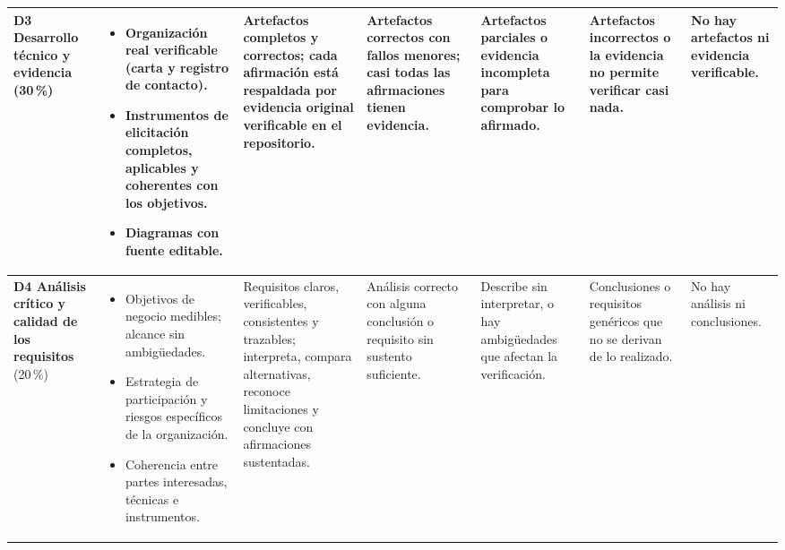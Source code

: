 \documentclass[11pt]{article}
\begin{document}
\begin{landscape}
{\begin{longtable}{|L{2.4cm}|L{5.6cm}|L{3.1cm}|L{2.8cm}|L{2.8cm}|L{2.7cm}|L{2.1cm}|}
	\hline
	\textbf{D3 Desarrollo técnico y evidencia} (30\,\%) & \begin{itemize}[leftmargin=9pt,itemsep=0pt,topsep=0pt,parsep=0pt,partopsep=0pt,after=\vspace{-\baselineskip}]\item Organización real verificable (carta y registro de contacto).\item Instrumentos de elicitación completos, aplicables y coherentes con los objetivos.\item Diagramas con fuente editable.\end{itemize} & Artefactos completos y correctos; cada afirmación está respaldada por evidencia original verificable en el repositorio. & Artefactos correctos con fallos menores; casi todas las afirmaciones tienen evidencia. & Artefactos parciales o evidencia incompleta para comprobar lo afirmado. & Artefactos incorrectos o la evidencia no permite verificar casi nada. & No hay artefactos ni evidencia verificable.\\
	\hline
	\textbf{D4 Análisis crítico y calidad de los requisitos} (20\,\%) & \begin{itemize}[leftmargin=9pt,itemsep=0pt,topsep=0pt,parsep=0pt,partopsep=0pt,after=\vspace{-\baselineskip}]\item Objetivos de negocio medibles; alcance sin ambigüedades.\item Estrategia de participación y riesgos específicos de la organización.\item Coherencia entre partes interesadas, técnicas e instrumentos.\end{itemize} & Requisitos claros, verificables, consistentes y trazables; interpreta, compara alternativas, reconoce limitaciones y concluye con afirmaciones sustentadas. & Análisis correcto con alguna conclusión o requisito sin sustento suficiente. & Describe sin interpretar, o hay ambigüedades que afectan la verificación. & Conclusiones o requisitos genéricos que no se derivan de lo realizado. & No hay análisis ni conclusiones.\\
	\hline

\end{longtable}}
\end{landscape}
\end{document}
